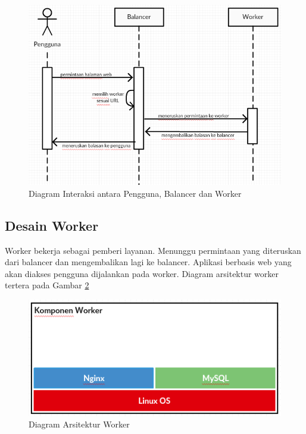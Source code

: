 \documentclass{ta-its}
\begin{document}
			    \begin{figure}[] %
			    	\centering
			    	\includegraphics[width=\linewidth]{contoh_img/kerjabalancer}
			    	\caption{Diagram Interaksi antara Pengguna, Balancer dan Worker}
			    	\label{gambarKerjaBalancer}
			    \end{figure}
			
			\subsection{Desain Worker}
				Worker bekerja sebagai pemberi layanan. Menunggu permintaan yang diteruskan dari balancer dan mengembalikan lagi ke balancer. Aplikasi berbasis web yang akan diakses pengguna dijalankan pada worker. Diagram arsitektur worker tertera pada Gambar \ref{gambarArsitekturWorker}
				
				\begin{figure}[] %
					\centering
					\includegraphics[width=\linewidth]{contoh_img/kompworker}
					\caption{Diagram Arsitektur Worker}
					\label{gambarArsitekturWorker}
				\end{figure}
				
\end{document}

